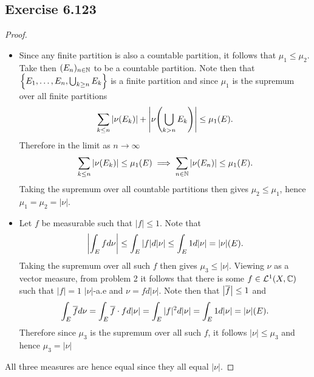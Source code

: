 \documentclass[hw_all.tex]{subfiles}
\begin{document}
\subsection{Exercise 6.123}

\begin{proof}
    \begin{itemize}
        \item[$\mu_1 = \mu_2)$] 
            Since any finite partition is also a countable partition, it follows that $\mu_1 \leq \mu_2$. Take then $(E_n)_{n \in \mathbb{N}}$ to be a countable partition. Note then that $\qty{E_1, \ldots, E_n, \bigcup_{k \geq n} E_k}$ is a finite partition and since $\mu_1$ is the supremum over all finite partitions
            \[
                \sum_{k \leq n} |\nu(E_k)| + \qty|\nu\qty(\bigcup_{k > n} E_k)| \leq \mu_1(E)
            .\]
            Therefore in the limit as $n \to \infty$
            \[
                \sum_{k \leq n} |\nu(E_k)| \leq \mu_1(E) \implies \sum_{n \in \mathbb{N}} |\nu(E_n)| \leq \mu_1(E)
            .\]
            Taking the supremum over all countable partitions then gives $\mu_2 \leq \mu_1$, hence $\mu_1 = \mu_2 = |\nu|$.

        \item[$\mu_3 = |v|)$]
            Let $f$ be measurable such that $|f| \leq 1$. Note that
            \[
                \qty|\int_E f d \nu| \leq \int_E |f| d|\nu| \leq \int_E 1 d|\nu| = |\nu|(E)
            .\]
            Taking the supremum over all such $f$ then gives $\mu_3 \leq |\nu|$. Viewing $\nu$ as a vector measure, from problem 2 it follows that there is some $f \in \mathcal{L}^1(X, \mathbb{C})$ such that $|f| = 1$ $|\nu|$-a.e and $\nu = f d|\nu|$. Note then that $\qty|\overline{f}| \leq 1$ and
            \[
                \int_E \overline{f} d \nu = \int_E \overline{f} \cdot f d|\nu| = \int_E |f|^2 d|\nu| = \int_E 1 d|\nu| = |\nu|(E)
            .\]
            Therefore since $\mu_3$ is the supremum over all such $f$, it follows $|\nu| \leq \mu_3$ and hence $\mu_3 = |\nu|$
    \end{itemize}
    All three measures are hence equal since they all equal $|\nu|$.
\end{proof}
\end{document}
